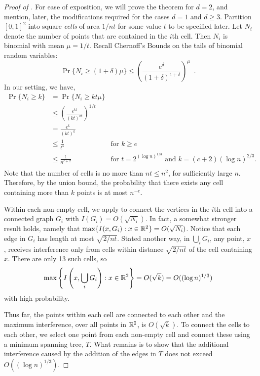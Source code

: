 \documentclass{patmorin}
\begin{document}
\begin{proof}[Proof of ]
For ease of exposition, we will prove the theorem for $d=2$, and mention,
later, the modifications required for the cases $d=1$ and $d\ge 3$.
Partition $[0,1]^2$ into square \emph{cells} of area $1/nt$ for some
value $t$ to be specified later.  Let $N_i$ denote the number of points
that are contained in the $i$th cell.  Then $N_i$ is binomial
with mean $\mu=1/t$.  Recall Chernoff's Bounds \cite{c52} on the tails
of binomial random variables:
\[
  \Pr\{N_i \ge (1+\delta)\mu\} 
    \le \left(\frac{e^\delta}{(1+\delta)^{1+\delta}}\right)^\mu \enspace .
\]
In our setting, we have, 
\begin{align*}
  \Pr\{N_i \ge k\} 
    & = \Pr\{N_i \ge kt\mu\} \\
    & \le \left(\frac{e^{kt}}{(kt)^{kt}}\right)^{1/t} \\
    & = \frac{e^{k}}{(kt)^{k}} \\
    & \le \frac{1}{t^{k}} & \text{for $k\ge e$} \\
    & \le \frac{1}{n^{c+2}} & \text{for $t=2^{(\log n)^{1/3}}$ and $k=(c+2)(\log n)^{2/3}$.} \\
\end{align*}
Note that the number of cells is no more than $nt\le
n^2$, for sufficiently large $n$.  Therefore, by the union bound, the
probability that there exists any cell containing more than $k$ points
is at most $n^{-c}$.

Within each non-empty cell, we apply  to
connect the vertices in the $i$th cell into a connected graph $G_i$
with $I(G_i)=O(\sqrt{N_i})$.  In fact, a somewhat stronger result holds,
namely that $\max\{I(x,G_i) : x\in\mathbb{R}^2\}=O(\sqrt{N_i})$.  Notice that
each edge in $G_i$ has length at most $\sqrt{2/nt}$.  Stated another
way, in $\bigcup_i G_i$, any point, $x$, receives interference only
from cells within distance $\sqrt{2/nt}$ of the cell containing $x$.
There are only 13 such cells, so
\[
  \max\left\{I\left(x,\bigcup_iG_i\right) : x\in\mathbb{R}^2\right\}=O(\sqrt{k}) 
    = O((\log n)^{1/3})
\]
with high probability.

Thus far, the points within each cell are connected to each other and
the maximum interference, over all points in $\mathbb{R}^2$, is $O(\sqrt{k})$.
To connect the cells to each other, we select one point from each
non-empty cell and connect these using a minimum spanning tree, $T$.
What remains is to show that the additional interference caused by the
addition of the edges in $T$ does not exceed $O((\log n)^{1/3})$.


\end{proof}
\end{document}
